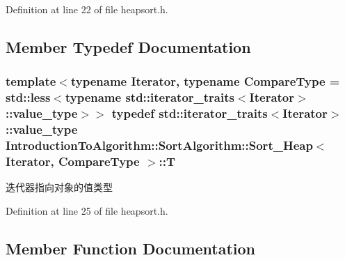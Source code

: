 Definition at line 22 of file heapsort.\+h.



\subsection{Member Typedef Documentation}
\hypertarget{class_introduction_to_algorithm_1_1_sort_algorithm_1_1_sort___heap_a5af910656f5d3c65d47f992dbf380c61}{}
\subsubsection[{T}]{\setlength{\rightskip}{0pt plus 5cm}template$<$typename Iterator, typename Compare\+Type = std\+::less$<$typename std\+::iterator\+\_\+traits$<$\+Iterator$>$\+::value\+\_\+type$>$$>$ typedef std\+::iterator\+\_\+traits$<$Iterator$>$\+::value\+\_\+type {\bf Introduction\+To\+Algorithm\+::\+Sort\+Algorithm\+::\+Sort\+\_\+\+Heap}$<$ Iterator, Compare\+Type $>$\+::{\bf T}}\label{class_introduction_to_algorithm_1_1_sort_algorithm_1_1_sort___heap_a5af910656f5d3c65d47f992dbf380c61}
迭代器指向对象的值类型 

Definition at line 25 of file heapsort.\+h.



\subsection{Member Function Documentation}
\hypertarget{class_introduction_to_algorithm_1_1_sort_algorithm_1_1_sort___heap_a0535910130c6c750faf7801059e4a9fa}{}
